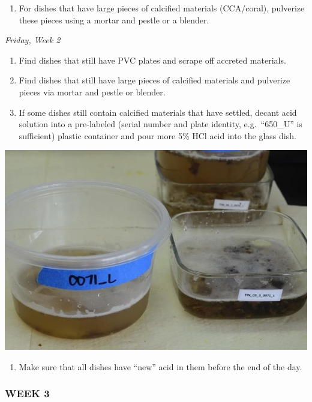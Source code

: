 \documentclass[
]{book}
\providecommand{\tightlist}{%
  \setlength{\itemsep}{0pt}\setlength{\parskip}{0pt}}
\begin{document}
\begin{enumerate}
\def\labelenumi{\arabic{enumi}.}
\setcounter{enumi}{4}
\tightlist
\item
  For dishes that have large pieces of calcified materials (CCA/coral), pulverize these pieces using a mortar and pestle or a blender.
\end{enumerate}

\emph{Friday, Week 2}

\begin{enumerate}
\def\labelenumi{\arabic{enumi}.}
\tightlist
\item
  Find dishes that still have PVC plates and scrape off accreted materials.
\item
  Find dishes that still have large pieces of calcified materials and pulverize pieces via mortar and pestle or blender.
\item
  If some dishes still contain calcified materials that have settled, decant acid solution into a pre-labeled (serial number and plate identity, e.g.~``650\_U'' is sufficient) plastic container and pour more 5\% HCl acid into the glass dish.
\end{enumerate}

\includegraphics{images/DailyTasks11.jpg}

\begin{enumerate}
\def\labelenumi{\arabic{enumi}.}
\setcounter{enumi}{3}
\tightlist
\item
  Make sure that all dishes have ``new'' acid in them before the end of the day.
\end{enumerate}

\hypertarget{week-3}{%
\subsubsection{WEEK 3}\label{week-3}}
\end{document}
